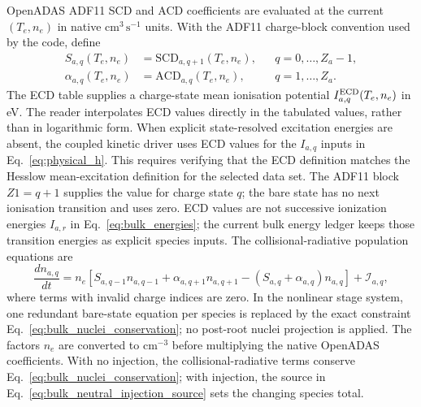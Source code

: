 \documentclass[11pt]{article}
\begin{document}
OpenADAS ADF11 SCD and ACD coefficients are evaluated at the current $(T_e,n_e)$ in native
$\mathrm{cm^3\,s^{-1}}$ units.  With the ADF11 charge-block convention used by the code,
define
\begin{align}
 S_{a,q}(T_e,n_e) &= \mathrm{SCD}_{a,q+1}(T_e,n_e),
 &&q=0,\ldots,Z_a-1,\\
 \alpha_{a,q}(T_e,n_e) &= \mathrm{ACD}_{a,q}(T_e,n_e),
 &&q=1,\ldots,Z_a.
 \label{eq:bulk_adas_rates}
\end{align}
The ECD table supplies a charge-state mean ionisation potential
$I^{\rm ECD}_{a,q}(T_e,n_e)$ in eV.  The reader interpolates ECD values directly in
the tabulated values, rather than in logarithmic form.  When explicit state-resolved
excitation energies are absent, the coupled kinetic driver uses ECD values for the
$I_{a,q}$ inputs in Eq.~\eqref{eq:physical_h}.  This requires verifying that the ECD
definition matches the Hesslow mean-excitation definition for the selected data set.
The ADF11 block $Z1=q+1$ supplies the value for charge state $q$; the bare state has
no next ionisation transition and uses zero.
ECD values are not successive ionization energies $I_{a,r}$ in
Eq.~\eqref{eq:bulk_energies}; the current bulk energy ledger keeps those transition
energies as explicit species inputs.
The collisional-radiative population equations are
\begin{equation}
 \frac{d n_{a,q}}{dt}
 = n_e\left[S_{a,q-1}n_{a,q-1}+\alpha_{a,q+1}n_{a,q+1}
 -(S_{a,q}+\alpha_{a,q})n_{a,q}\right]
 +\mathcal I_{a,q},
 \label{eq:bulk_charge_state_rhs}
\end{equation}
where terms with invalid charge indices are zero.  In the nonlinear stage system, one
redundant bare-state equation per species is replaced by the exact constraint
Eq.~\eqref{eq:bulk_nuclei_conservation}; no post-root nuclei projection is applied.
The factors $n_e$ are converted to
$\mathrm{cm^{-3}}$ before multiplying the native OpenADAS coefficients.  With no injection,
the collisional-radiative terms conserve Eq.~\eqref{eq:bulk_nuclei_conservation}; with
injection, the source in Eq.~\eqref{eq:bulk_neutral_injection_source} sets the changing
species total.
\end{document}
